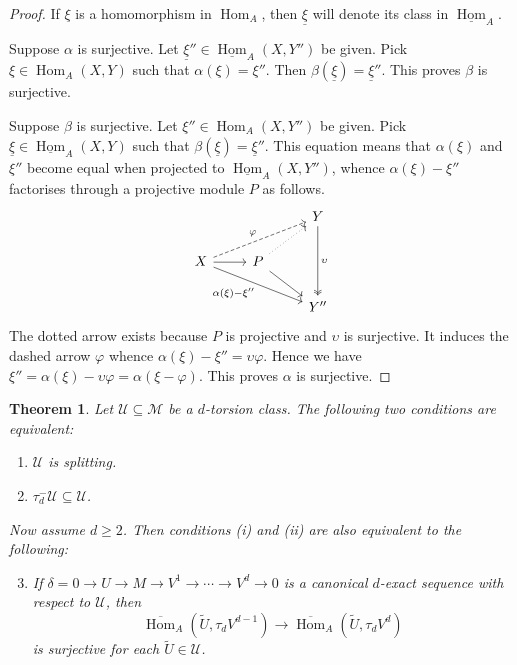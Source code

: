 \documentclass[12pt,reqno]{amsart}
\def\cM{\mathscr{M}}
\def\cU{\mathscr{U}}
\def\Hom{\operatorname{Hom}}
\numberwithin{equation}{section}
\newtheorem{Theorem}[Lemma]{Theorem}
\theoremstyle{definition}
\theoremstyle{theorem}
\theoremstyle{definition}
\begin{document}
\begin{proof}
If $\xi$ is a homomorphism in $\Hom_A$, then $\underline{ \xi }$ will denote its class in $\underline{ \Hom }_A$.  

Suppose $\alpha$ is surjective.  Let $\underline{ \xi }'' \in \underline{ \Hom }_A( X,Y'' )$ be given.  Pick $\xi \in \Hom_A( X,Y )$ such that $\alpha( \xi ) = \xi''$.  Then $\beta( \underline{ \xi } ) = \underline{ \xi }''$.  This proves $\beta$ is surjective.

Suppose $\beta$ is surjective.  Let $\xi'' \in \Hom_A( X,Y'' )$ be given.  Pick $\underline{ \xi } \in \underline{ \Hom }_A( X,Y )$ such that $\beta( \underline{ \xi } ) = \underline{ \xi }''$.  This equation means that $\alpha( \xi )$ and $\xi''$ become equal when projected to $\underline{ \Hom }_A( X,Y'' )$, whence $\alpha( \xi ) - \xi''$ factorises through a projective module $P$ as follows.
\[
\begin{tikzcd}
	&& Y \\
	X & P \\
	&& {Y''}
	\arrow["\upsilon", two heads, from=1-3, to=3-3]
	\arrow["\varphi", dashed, from=2-1, to=1-3]
	\arrow[from=2-1, to=2-2]
	\arrow["{\alpha( \xi ) - \xi''}"', from=2-1, to=3-3]
	\arrow[dotted, from=2-2, to=1-3]
	\arrow[from=2-2, to=3-3]
\end{tikzcd}
\]
The dotted arrow exists because $P$ is projective and $\upsilon$ is surjective.  It induces the dashed arrow $\varphi$ whence $\alpha( \xi ) - \xi'' = \upsilon\varphi$.  Hence we have $\xi'' = \alpha( \xi ) - \upsilon\varphi = \alpha( \xi - \varphi )$.  This proves $\alpha$ is surjective.
\end{proof}


\begin{Theorem}
\label{thm:generalisation_of_ASS_VI1.7}
Let $\cU \subseteq \cM$ be a $d$-torsion class.  The following two conditions are equivalent:
\begin{enumerate}
\setlength\itemsep{4pt}

  \item  $\cU$ is splitting.
  
  \item  $\tau_d^-\cU \subseteq \cU\!$.

\end{enumerate}
Now assume $d \geqslant 2$.  Then conditions (i) and (ii) are also equivalent to the following:
\begin{enumerate}
\setcounter{enumi}{2}
\setlength\itemsep{4pt}

  \item  If $\delta = 0 \xrightarrow{} U \xrightarrow{} M \xrightarrow{} V^1 \xrightarrow{} \cdots \xrightarrow{} V^d \xrightarrow{} 0$ is a canonical $d$-exact sequence with respect to $\cU$, then
\[  
  \overline{ \Hom }_A( \widetilde{ U },\tau_dV^{ d-1 } ) \xrightarrow{} \overline{ \Hom }_A( \widetilde{ U },\tau_dV^{ d } )
\]  
is surjective for each $\widetilde{ U } \in \cU$.  

\end{enumerate}
\end{Theorem}
\end{document}
